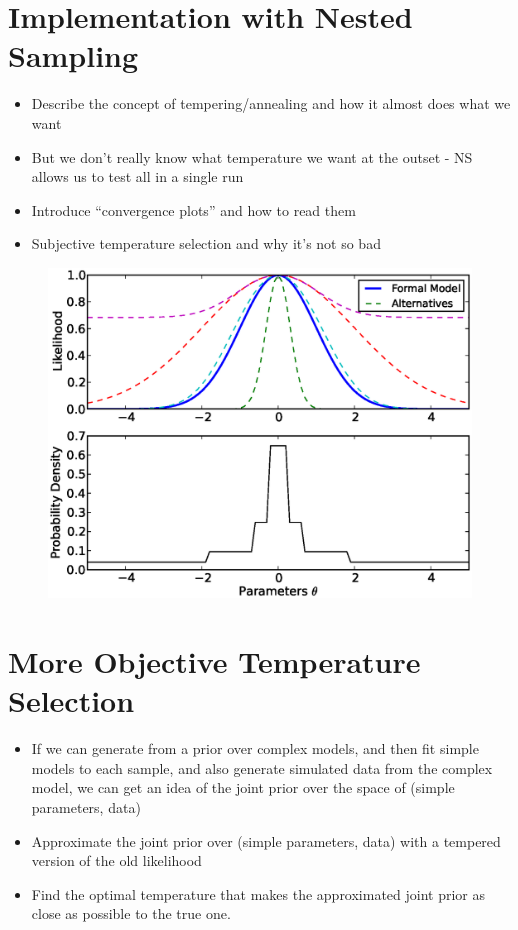 \documentclass[letterpaper, 11pt]{article}
\begin{document}
\section{Implementation with Nested Sampling}
\begin{itemize}
\item Describe the concept of tempering/annealing and how it almost does what we want \\
\item But we don't really know what temperature we want at the outset - NS allows us to test all in a single run
\item Introduce ``convergence plots'' and how to read them
\item Subjective temperature selection and why it's not so bad
\end{itemize}

\begin{figure}
\begin{center}
\includegraphics[scale=0.7]{nested.eps}
\end{center}
\end{figure}

\section{More Objective Temperature Selection}
\begin{itemize}
\item If we can generate from a prior over complex models, and then fit simple models to each sample, and also generate simulated data from the complex model, we can get an idea of the joint prior over the space of (simple parameters, data)\\
\item Approximate the joint prior over (simple parameters, data) with a tempered version of the old likelihood \\
\item Find the optimal temperature that makes the approximated joint prior as close as possible to the true one.
\end{itemize}
\end{document}
